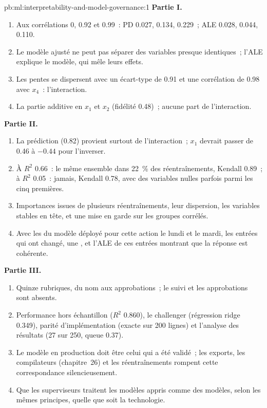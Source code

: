 \begin{solution}{pb:ml:interpretability-and-model-governance:1}
\textbf{Partie I.}
\begin{enumerate}
\item Aux corrélations 0, 0.92 et 0.99~: PD 0.027, 0.134, 0.229~; ALE 0.028, 0.044, 0.110.
\item Le modèle ajusté ne peut pas séparer des variables presque identiques~; l'ALE explique le modèle, qui mêle leurs effets.
\item Les pentes se dispersent avec un écart-type de 0.91 et une corrélation de 0.98 avec $x_4$~: l'interaction.
\item La partie additive en $x_1$ et $x_2$ (fidélité 0.48)~; aucune part de l'interaction.
\end{enumerate}
\textbf{Partie II.}
\begin{enumerate}[resume]
\item La prédiction (0.82) provient surtout de l'interaction~; $x_1$ devrait passer de 0.46 à $-0.44$ pour l'inverser.
\item À $R^2$ 0.66~: le même ensemble dans 22~\% des réentraînements, Kendall 0.89~; à $R^2$ 0.05~: jamais, Kendall 0.78, avec des variables nulles
parfois parmi les cinq premières.
\item Importances issues de plusieurs réentraînements, leur dispersion, les variables stables en tête, et une mise en garde sur les groupes corrélés.
\item Avec les  du modèle déployé pour cette action le lundi et le mardi, les entrées qui ont changé, une ,
et l'ALE de ces entrées montrant que la réponse est cohérente.
\end{enumerate}
\textbf{Partie III.}
\begin{enumerate}[resume]
\item Quinze rubriques, du nom aux approbations~; le suivi et les approbations sont absents.
\item Performance hors échantillon ($R^2$ 0.860), le challenger (régression ridge 0.349), parité d'implémentation (exacte sur 200 lignes) et
l'analyse des résultats (27 sur 250, queue 0.37).
\item Le modèle en production doit être celui qui a été validé~; les exports, les compilateurs (chapitre~26) et les réentraînements rompent cette correspondance silencieusement.
\item Que les superviseurs traitent les modèles appris comme des modèles, selon les mêmes principes, quelle que soit la technologie.

\end{enumerate}
\end{solution}

